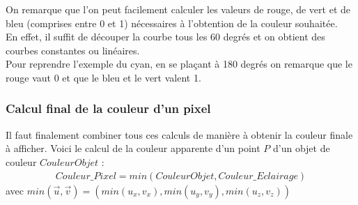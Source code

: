 On remarque que l'on peut facilement calculer les valeurs de rouge, de vert et de bleu (comprises entre 0 et 1) nécessaires à l'obtention de la couleur souhaitée.\\
En effet, il suffit de découper la courbe tous les 60 degrés et on obtient des courbes constantes ou linéaires.\\
Pour reprendre l'exemple du cyan, en se plaçant à 180 degrés on remarque que le rouge vaut 0 et que le bleu et le vert valent 1.


\subsubsection{Calcul final de la couleur d'un pixel}
Il faut finalement combiner tous ces calculs de manière à obtenir la couleur finale à afficher. Voici le calcul de la couleur apparente d'un point $P$ d'un objet de couleur $CouleurObjet$ :
\begin{align*}
    Couleur\_Pixel=min(CouleurObjet,Couleur\_Eclairage)%
\end{align*}
avec $min(\Vec{u},\Vec{v})=(min(u_x,v_x),min(u_y,v_y),min(u_z,v_z))$
